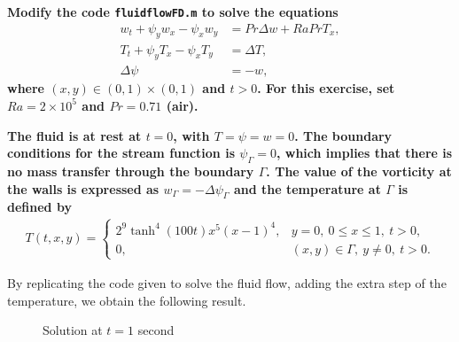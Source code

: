 \textbf{Modify the code \texttt{fluidflowFD.m} to solve the equations}
\begin{align*}
 w_t + \psi_y w_x - \psi_xw_y &= Pr \Delta w + RaPrT_x, \\
 T_t + \psi_y T_x - \psi_xT_y &= \Delta T, \\
\Delta \psi &= -w,
\end{align*}
\textbf{where $(x,y) \in (0,1) \times (0,1)$ and $t>0$. For this exercise, set $Ra = 2 \times 10^5$ and $Pr = 0.71$ (air).}

\textbf{The fluid is at rest at $t=0$, with $T = \psi = w = 0$. The boundary conditions for the stream function is $\psi_{\Gamma} = 0$, which implies that there is no mass transfer through the boundary $\Gamma$. The value of the vorticity at the walls is expressed as $w_{\Gamma} = -\Delta \psi_{\Gamma}$ and the temperature at $\Gamma$ is defined by}
\begin{align*}
T(t,x,y) = \begin{cases}
2^9\tanh^4(100t)x^5(x-1)^4,& y =0,~0\leq x \leq 1,~t>0, \\
0, & (x,y) \in \Gamma,~y\neq 0,~t>0.
\end{cases}
\end{align*}

By replicating the code given to solve the fluid flow, adding the extra step of the temperature, we obtain the following result.

\begin{figure}[H]
\caption{Solution at $t=1$ second}
\end{figure}

